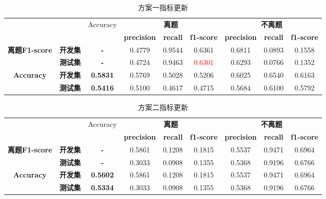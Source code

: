 \documentclass[11pt]{article}
\begin{document}
\begin{CJK}{UTF8}{gkai}
\begin{table}[htbp]
  \centering
  \begin{tabular}{cc|c|ccc|ccc}
    \hline
    \multicolumn{2}{c}{\multirow{2}[0]{*}{}} & \multirow{2}[0]{*}{Accuracy} & \multicolumn{3}{c}{\textbf{离题}} & \multicolumn{3}{c}{\textbf{不离题}} \\
    \multicolumn{2}{c}{} &       & \textbf{precision} & \textbf{recall} & \textbf{f1-score} & \textbf{precision} & \textbf{recall} & \textbf{f1-score} \\
    \hline
    \multirow{2}[0]{*}{\textbf{离题F1-score}} & \textbf{开发集} & \textbf{-} & 0.4779  & 0.9544  & 0.6361  & 0.6811  & 0.0893  & 0.1558  \\
    & \textbf{测试集} & \textbf{-} & 0.4724  & 0.9463  & \textcolor{red}{0.6301}  & 0.6293  & 0.0766  & 0.1352  \\
    \hline
    \multirow{2}[0]{*}{\textbf{Accuracy}} & \textbf{开发集} & \textbf{0.5831 } & 0.5769  & 0.5028  & 0.5206  & 0.6025  & 0.6540  & 0.6163  \\
    & \textbf{测试集} & \textbf{0.5416 } & 0.5100  & 0.4617  & 0.4715  & 0.5684  & 0.6100  & 0.5792  \\
    \hline
  \end{tabular}%
  \caption{方案一指标更新}
  \label{tab:addlabel}%
\end{table}%

\begin{table}[htbp]
  \centering
  \begin{tabular}{cc|c|ccc|ccc}
    \hline
    \multicolumn{2}{c}{\multirow{2}[0]{*}{}} & \multirow{2}[0]{*}{Accuracy} & \multicolumn{3}{c}{\textbf{离题}} & \multicolumn{3}{c}{\textbf{不离题}} \\
    \multicolumn{2}{c}{} &       & \textbf{precision} & \textbf{recall} & \textbf{f1-score} & \textbf{precision} & \textbf{recall} & \textbf{f1-score} \\
    \hline
    \multirow{2}[0]{*}{\textbf{离题F1-score}} & \textbf{开发集} & \textbf{-} & 0.5861  & 0.1208  & 0.1815  & 0.5537  & 0.9471  & 0.6964  \\
    & \textbf{测试集} & \textbf{-} & 0.3033  & 0.0908  & 0.1355  & 0.5368  & 0.9196  & 0.6766  \\
    \hline
    \multirow{2}[0]{*}{\textbf{Accuracy}} & \textbf{开发集} & \textbf{0.5602 } & 0.5861  & 0.1208  & 0.1815  & 0.5537  & 0.9471  & 0.6964  \\
    & \textbf{测试集} & \textbf{0.5334 } & 0.3033  & 0.0908  & 0.1355  & 0.5368  & 0.9196  & 0.6766  \\
    \hline
  \end{tabular}%
  \caption{方案二指标更新}
  \label{tab:addlabel}%
\end{table}%






\end{CJK}
\end{document}
